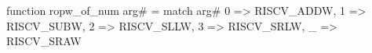 function ropw_of_num arg# = match arg# {
  0 => RISCV_ADDW,
  1 => RISCV_SUBW,
  2 => RISCV_SLLW,
  3 => RISCV_SRLW,
  _ => RISCV_SRAW
}
